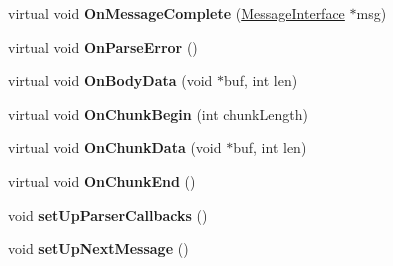 \begin{DoxyCompactItemize}
\item 
\mbox{\label{class_parser_a8cd09a2975183aeabc46f492291d10ba}} 
virtual void {\bfseries On\+Message\+Complete} (\hyperlink{class_message_interface}{Message\+Interface} $\ast$msg)
\item 
\mbox{\label{class_parser_a721ea9e9c80070e4b41e664329f0c4a4}} 
virtual void {\bfseries On\+Parse\+Error} ()
\item 
\mbox{\label{class_parser_ab8c3d57fb793c4a5799020e474b7f6f7}} 
virtual void {\bfseries On\+Body\+Data} (void $\ast$buf, int len)
\item 
\mbox{\label{class_parser_aba88a1d565dffa2c4845bb74e4e8b09e}} 
virtual void {\bfseries On\+Chunk\+Begin} (int chunk\+Length)
\item 
\mbox{\label{class_parser_ab6b2ca1970700b5d1ac9a87cb2bf2776}} 
virtual void {\bfseries On\+Chunk\+Data} (void $\ast$buf, int len)
\item 
\mbox{\label{class_parser_af755405a007c893d17f2179b06152eda}} 
virtual void {\bfseries On\+Chunk\+End} ()
\item 
\mbox{\label{class_parser_af14d6a9a94ce9c59690a432571dbc371}} 
void {\bfseries set\+Up\+Parser\+Callbacks} ()
\item 
\mbox{\label{class_parser_a34cc536f1137eeadca5ab67c681355aa}} 
void {\bfseries set\+Up\+Next\+Message} ()
\end{DoxyCompactItemize}
